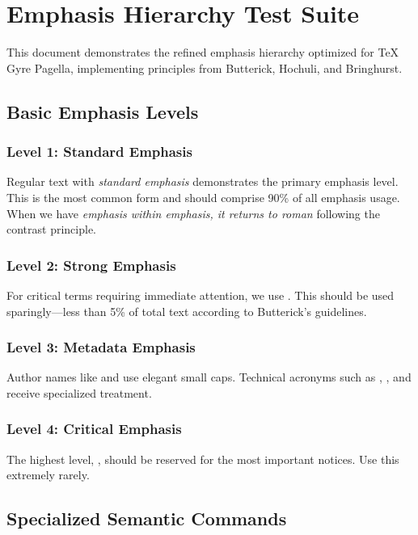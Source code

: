 \documentclass[11pt,a4paper]{article}
\begin{document}
\section{Emphasis Hierarchy Test Suite}

This document demonstrates the refined emphasis hierarchy optimized for TeX Gyre Pagella, implementing principles from Butterick, Hochuli, and Bringhurst.

\subsection{Basic Emphasis Levels}

\subsubsection{Level 1: Standard Emphasis}

Regular text with \emph{standard emphasis} demonstrates the primary emphasis level. This is the most common form and should comprise 90\% of all emphasis usage. When we have \emph{emphasis within emphasis, it returns to roman} following the contrast principle.

\subsubsection{Level 2: Strong Emphasis}

For critical terms requiring immediate attention, we use . This should be used sparingly---less than 5\% of total text according to Butterick's guidelines.

\subsubsection{Level 3: Metadata Emphasis}

Author names like  and  use elegant small caps. Technical acronyms such as , , and  receive specialized treatment.

\subsubsection{Level 4: Critical Emphasis}

The highest level, , should be reserved for the most important notices. Use this extremely rarely.

\subsection{Specialized Semantic Commands}
\end{document}

